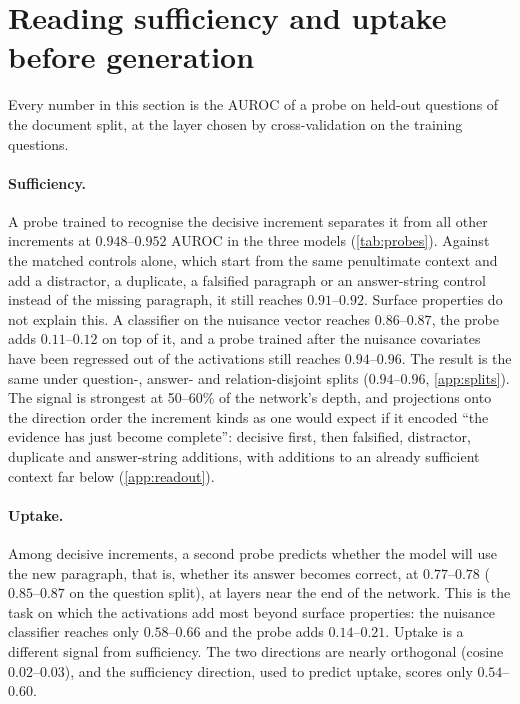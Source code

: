 \section{Reading sufficiency and uptake before generation}
\label{sec:readout}

Every number in this section is the AUROC of a probe on held-out questions of the document split, at the layer chosen by cross-validation on the training questions.

\begin{table}[t]
\centering\small
\setlength{\tabcolsep}{3pt}

\caption{Held-out AUROC of the probe on paired updates $\Delta h$ (document split; 95\% question-level bootstrap intervals). ``nuis.'': a classifier that sees only surface properties of the increment (length change, presence of the answer string, lexical relevance, change in output confidence). ``gain'': AUROC added when the probe score is given to that classifier.}
\label{tab:probes}
\end{table}

\paragraph{Sufficiency.}
A probe trained to recognise the decisive increment separates it from all other increments at $0.948$--$0.952$ AUROC in the three models (\cref{tab:probes}). Against the matched controls alone, which start from the same penultimate context and add a distractor, a duplicate, a falsified paragraph or an answer-string control instead of the missing paragraph, it still reaches $0.91$--$0.92$. Surface properties do not explain this. A classifier on the nuisance vector reaches $0.86$--$0.87$, the probe adds $0.11$--$0.12$ on top of it, and a probe trained after the nuisance covariates have been regressed out of the activations still reaches $0.94$--$0.96$. The result is the same under question-, answer- and relation-disjoint splits ($0.94$--$0.96$, \cref{app:splits}). The signal is strongest at 50--60\% of the network's depth, and projections onto the direction order the increment kinds as one would expect if it encoded ``the evidence has just become complete'': decisive first, then falsified, distractor, duplicate and answer-string additions, with additions to an already sufficient context far below (\cref{app:readout}).

\paragraph{Uptake.}
Among decisive increments, a second probe predicts whether the model will use the new paragraph, that is, whether its answer becomes correct, at $0.77$--$0.78$ ($0.85$--$0.87$ on the question split), at layers near the end of the network. This is the task on which the activations add most beyond surface properties: the nuisance classifier reaches only $0.58$--$0.66$ and the probe adds $0.14$--$0.21$. Uptake is a different signal from sufficiency. The two directions are nearly orthogonal (cosine $0.02$--$0.03$), and the sufficiency direction, used to predict uptake, scores only $0.54$--$0.60$.


